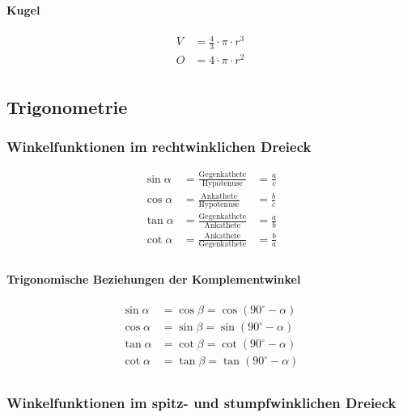 \paragraph{Kugel}
\begin{align*}
    V &= \frac{4}{3} \cdot \pi \cdot r^3 \\
    O &= 4 \cdot \pi \cdot r^2 \\
\end{align*}

\subsection{Trigonometrie}
\subsubsection{Winkelfunktionen im rechtwinklichen Dreieck}
\begin{align*}
    \sin \alpha &= \frac{\textrm{Gegenkathete}}{\textrm{Hypotenuse}}  &= \frac{a}{c} \\
    \cos \alpha &= \frac{\textrm{Ankathete}}{\textrm{Hypotenuse}}     &= \frac{b}{c} \\
    \tan \alpha &= \frac{\textrm{Gegenkathete}}{\textrm{Ankathete}}   &= \frac{a}{b} \\
    \cot \alpha &= \frac{\textrm{Ankathete}}{\textrm{Gegenkathete}}   & = \frac{b}{a} \\
\end{align*}

\paragraph{Trigonomische Beziehungen der Komplementwinkel}
\begin{align*}
    \sin \alpha &= \cos \beta  = \cos (90^\circ - \alpha) \\
    \cos \alpha &= \sin \beta  = \sin (90^\circ - \alpha) \\
    \tan \alpha &= \cot \beta  = \cot (90^\circ - \alpha) \\
    \cot \alpha &= \tan \beta  = \tan (90^\circ - \alpha) \\
\end{align*}


\subsubsection{Winkelfunktionen im spitz- und stumpfwinklichen Dreieck}


